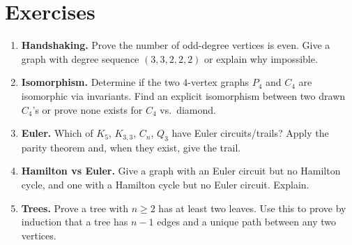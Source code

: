 \section{Exercises}
\label{sec:ch07-exercises}
\begin{enumerate}[label=E7.\arabic*, leftmargin=*, itemsep=0.6em]
\item \textbf{Handshaking.} Prove the number of odd-degree vertices is even. Give a graph with degree sequence $(3,3,2,2,2)$ or explain why impossible.
\item \textbf{Isomorphism.} Determine if the two $4$-vertex graphs $P_4$ and $C_4$ are isomorphic via invariants. Find an explicit isomorphism between two drawn $C_4$'s or prove none exists for $C_4$ vs.\ diamond.
\item \textbf{Euler.} Which of $K_5$, $K_{3,3}$, $C_n$, $Q_3$ have Euler circuits/trails? Apply the parity theorem and, when they exist, give the trail.
\item \textbf{Hamilton vs Euler.} Give a graph with an Euler circuit but no Hamilton cycle, and one with a Hamilton cycle but no Euler circuit. Explain.
\item \textbf{Trees.} Prove a tree with $n\ge2$ has at least two leaves. Use this to prove by induction that a tree has $n-1$ edges and a unique path between any two vertices.
\end{enumerate}
